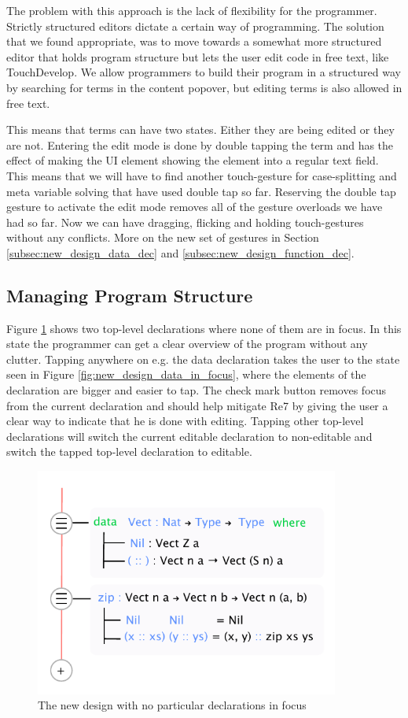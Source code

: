 The problem with this approach is the lack of flexibility for the programmer.
Strictly structured editors dictate a certain way of programming. The solution
that we found appropriate, was to move towards a somewhat more structured editor that holds program structure but lets the user edit code in free text, like TouchDevelop. We allow programmers
to build their program in a structured way by searching for terms in the
content popover, but editing terms is also allowed in free text.

This means that terms can have two states. Either they are being edited or they are not. Entering the edit mode is done by double tapping the term and has the effect of making the UI element showing the element into a regular text field. This means that we will have to find another touch-gesture for case-splitting and meta variable solving
that have used double tap so far. Reserving
the double tap
gesture to activate the edit mode removes all of the gesture overloads we have
had so far. Now we can have dragging, flicking and holding touch-gestures
without any conflicts. More on the new set of gestures in Section \ref{subsec:new_design_data_dec} and \ref{subsec:new_design_function_dec}.

\subsection{Managing Program Structure}
Figure \ref{fig:new_design_nothing_in_focus} shows two top-level declarations
where none of them are in focus. In this state the programmer can get a clear
overview of the program without any clutter. Tapping anywhere on e.g.
the data declaration takes the user to the state seen in Figure \ref{fig:new_design_data_in_focus},
where the elements of the declaration are bigger and easier to tap. The check mark button
removes focus from the current declaration and should help mitigate Re7 by
giving the user a clear way to indicate that he is done with editing. Tapping
other top-level declarations will switch the current editable declaration to
non-editable and switch the tapped top-level declaration to editable.

\begin{figure}
	\centering
		\includegraphics[width=100mm]{diagrams/final_design_nothing_in_focus.pdf}
	\caption{The new design with no particular declarations in focus}
\label{fig:new_design_nothing_in_focus}
\end{figure}

